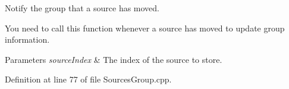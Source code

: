 Notify the group that a source has moved. 

You need to call this function whenever a source has moved to update group information. 
\begin{DoxyParams}{Parameters}
{\em source\-Index} & The index of the source to store. \\
\hline
\end{DoxyParams}


Definition at line 77 of file Sources\-Group.\-cpp.

